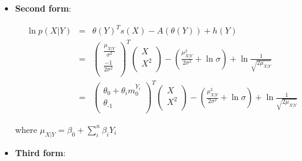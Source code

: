 \documentclass[11pt, oneside]{article}   	%
\numberwithin{figure}{section}
\numberwithin{equation}{section}
\numberwithin{table}{section}
\begin{document}
\begin{itemize}
\item \textbf{Second form}:

\begin{eqnarray*}
\ln p(X|Y) &=& \theta(Y)^T s(X) - A(\theta(Y)) + h(Y)\\
&=&
\begin{pmatrix}
\frac{\mu_{X|Y}}{\sigma^2}\\
\frac{-1}{2\sigma^2}\\
\end{pmatrix}^T
\begin{pmatrix}
X\\
X^2\\
\end{pmatrix}
- \left(\frac{\mu_{X|Y}^2}{2\sigma^2} + \ln{\sigma}\right) + \ln{\frac{1}{\sqrt{2\mu_{X|Y}}}} \\
&=&
\begin{pmatrix}
\theta_0+\theta_i m_0^{Y_i}\\
\theta_{\mbox{-}1}\\
\end{pmatrix}^T
\begin{pmatrix}
X\\
X^2\\
\end{pmatrix}
- \left(\frac{\mu_{X|Y}^2}{2\sigma^2} + \ln{\sigma}\right) + \ln{\frac{1}{\sqrt{2\mu_{X|Y}}}} 
\end{eqnarray*}

where $\mu_{X|Y} = \beta_0+\sum_i^n{\beta_i Y_i}$

\item \textbf{Third form}:


\end{itemize}
\end{document}

